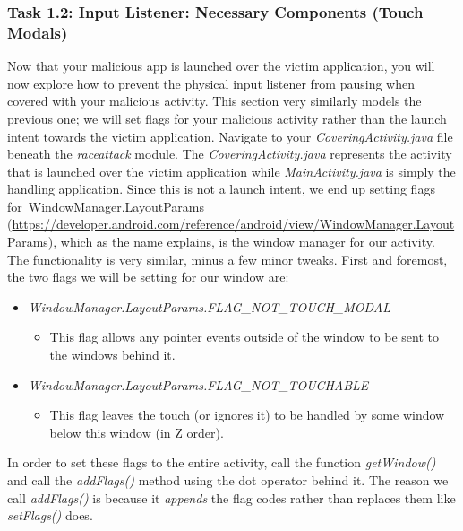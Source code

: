 \documentclass[letterpaper,12pt]{report}
\begin{document}
\subsubsection*{Task 1.2: Input Listener: Necessary Components (Touch Modals)}\label{sec:Task-1.1-Input-Listener-Necessary-Components-Touch-Modals}

Now that your malicious app is launched over the victim application, you will now explore how to prevent the physical input listener from pausing when covered with your malicious activity. This section very similarly models the previous one; we will set flags for your malicious activity rather than the launch intent towards the victim application. Navigate to your \emph{CoveringActivity.java} file beneath the \emph{raceattack} module. The \emph{CoveringActivity.java} represents the activity that is launched over the victim application while \emph{MainActivity.java} is simply the handling application. Since this is not a launch intent, we end up setting flags for~\href{https://developer.android.com/reference/android/view/WindowManager.LayoutParams}{WindowManager.LayoutParams} (\url{https://developer.android.com/reference/android/view/WindowManager.LayoutParams}), which as the name explains, is the window manager for our activity. The functionality is very similar, minus a few minor tweaks. First and foremost, the two flags we will be setting for our window are:

\begin{itemize}
  \item \emph{WindowManager.LayoutParams.FLAG\_NOT\_TOUCH\_MODAL}
  \begin{itemize}
    \item[] This flag allows any pointer events outside of the window to be sent to the windows behind it.
  \end{itemize}
  \item \emph{WindowManager.LayoutParams.FLAG\_NOT\_TOUCHABLE}
  \begin{itemize}
    \item[] This flag leaves the touch (or ignores it) to be handled by some window below this window (in Z order).
  \end{itemize}
\end{itemize}
\bigskip

In order to set these flags to the entire activity, call the function \emph{getWindow()} and call the \emph{addFlags()} method using the dot operator behind it. The reason we call \emph{addFlags()} is because it \textit{appends} the flag codes rather than replaces them like \emph{setFlags()} does. 
\end{document}
